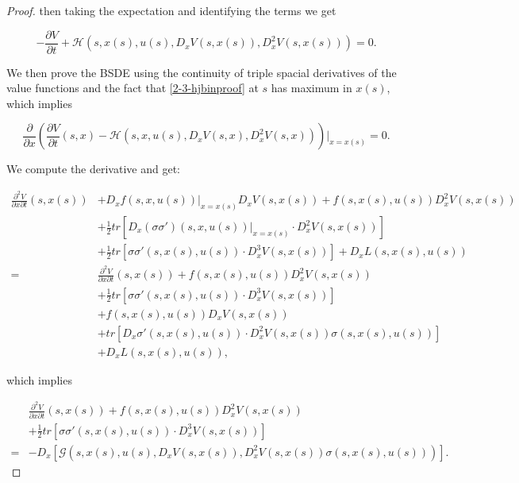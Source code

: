 \begin{theorem}
\begin{proof}
        then taking the expectation and identifying the terms we get

        \begin{equation}\label{2-3-hjbinproof}
            -\frac{\partial V}{\partial t} + \mathcal{H}(s,x(s),u(s),D_xV(s,x(s)),D_x^2V(s,x(s))) = 0.
        \end{equation}

        We then prove the BSDE using the continuity of triple spacial derivatives of the value functions and 
        the fact that \eqref{2-3-hjbinproof} at $s$ has maximum in $x(s)$, which implies

        \[\frac{\partial}{\partial x}\left(\frac{\partial V}{\partial t}(s,x) - \mathcal{H}(s,x,u(s),D_xV(s,x),D_x^2V(s,x))\right)|_{x=x(s)}=0.\]

        We compute the derivative and get:

        \begin{align*}
            \frac{\partial^2V}{\partial x\partial t}(s,x(s)) & + D_xf(s,x,u(s))|_{x=x(s)}D_xV(s,x(s)) + f(s,x(s),u(s))D_x^2V(s,x(s)) \\
            & + \frac{1}{2}tr\left[D_x(\sigma\sigma')(s,x,u(s))|_{x=x(s)}\cdot D_x^2V(s,x(s))\right] \\
            & + \frac{1}{2}tr\left[\sigma\sigma'(s,x(s),u(s))\cdot D_x^3V(s,x(s))\right] + D_xL(s,x(s),u(s)) \\
            = & \frac{\partial^2V}{\partial x\partial t}(s,x(s)) + f(s,x(s),u(s))D_x^2V(s,x(s)) \\
            & + \frac{1}{2}tr\left[\sigma\sigma'(s,x(s),u(s))\cdot D_x^3V(s,x(s))\right] \\
            & + f(s,x(s),u(s))D_xV(s,x(s)) \\
            & + tr\left[D_x\sigma'(s,x(s),u(s))\cdot D_x^2V(s,x(s))\sigma(s,x(s),u(s))\right] \\
            & + D_xL(s,x(s),u(s)),
        \end{align*}

        which implies

        \begin{equation}\label{2-3-relD3G}
            \begin{align*}
                & \frac{\partial^2V}{\partial x\partial t}(s,x(s)) + f(s,x(s),u(s))D_x^2V(s,x(s)) \\
                & + \frac{1}{2}tr\left[\sigma\sigma'(s,x(s),u(s))\cdot D_x^3V(s,x(s))\right] \\
                = & -D_x\left[\mathcal{G}(s,x(s),u(s),D_xV(s,x(s)),D_x^2V(s,x(s))\sigma(s,x(s),u(s)))\right].
            \end{align*}
        \end{equation}


\end{proof}
\end{theorem}
